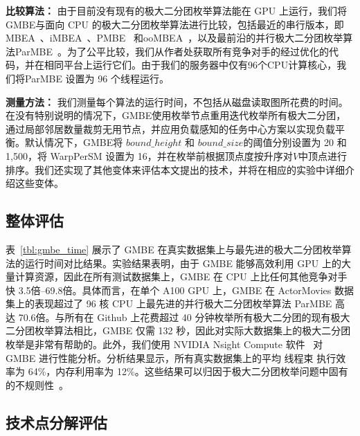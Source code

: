 \textbf{比较算法：} 由于目前没有现有的极大二分团枚举算法能在 GPU 上运行，我们将GMBE与面向 CPU 的极大二分团枚举算法进行比较，包括最近的串行版本，即 MBEA~\cite{iMBEA14}、iMBEA~\cite{iMBEA14}、PMBE~\cite{PMBE20} 和ooMBEA~\cite{ooMBE22}，以及最前沿的并行极大二分团枚举算法ParMBE~\cite{parMBE19}。为了公平比较，我们从作者处获取所有竞争对手的经过优化的代码，并在相同平台上运行它们。由于我们的服务器中仅有96个CPU计算核心，我们将ParMBE 设置为 96 个线程运行。

\textbf{测量方法：} 我们测量每个算法的运行时间，不包括从磁盘读取图所花费的时间。在没有特别说明的情况下，GMBE使用枚举节点重用迭代枚举所有极大二分团，通过局部邻居数量裁剪无用节点，并应用负载感知的任务中心方案以实现负载平衡。默认情况下，GMBE将 $bound\_height$ 和 $bound\_size$的阈值分别设置为 20 和 1,500，将 \textsf{WarpPerSM} 设置为 16，并在枚举前根据顶点度按升序对$V$中顶点进行排序。我们还实现了其他变体来评估本文提出的技术，并将在相应的实验中详细介绍这些变体。


\subsection{整体评估}



表~\ref{tbl:gmbe_time} 展示了 GMBE 在真实数据集上与最先进的极大二分团枚举算法的运行时间对比结果。实验结果表明，由于 GMBE 能够高效利用 GPU 上的大量计算资源，因此在所有测试数据集上，GMBE 在 CPU 上比任何其他竞争对手快 3.5倍--69.8倍。具体而言，在单个 A100 GPU 上，GMBE 在 ActorMovies 数据集上的表现超过了 96 核 CPU 上最先进的并行极大二分团枚举算法 ParMBE 高达 70.6倍。与所有在 Github 上花费超过 40 分钟枚举所有极大二分团的现有极大二分团枚举算法相比，GMBE 仅需 132 秒，因此对实际大数据集上的极大二分团枚举是非常有帮助的。此外，我们使用 NVIDIA Nsight Compute 软件~\cite{Nsight} 对 GMBE 进行性能分析。分析结果显示，所有真实数据集上的平均 线程束 执行效率为 64\%，内存利用率为 12\%。这些结果可以归因于极大二分团枚举问题中固有的不规则性~\cite{Irregularity12}。






\subsection{技术点分解评估}
\label{subsec:gmbe_breakdown}


